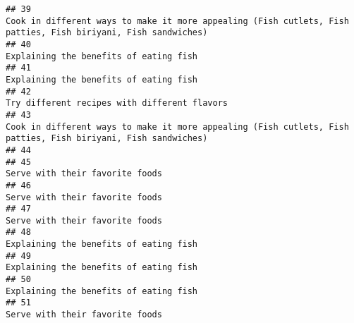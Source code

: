 \documentclass[
]{article}
\begin{document}
\begin{verbatim}
## 39                                                                                                 Cook in different ways to make it more appealing (Fish cutlets, Fish patties, Fish biriyani, Fish sandwiches)
## 40                                                                                                                                                                        Explaining the benefits of eating fish
## 41                                                                                                                                                                        Explaining the benefits of eating fish
## 42                                                                                                                                                                  Try different recipes with different flavors
## 43                                                                                                 Cook in different ways to make it more appealing (Fish cutlets, Fish patties, Fish biriyani, Fish sandwiches)
## 44                                                                                                                                                                                                              
## 45                                                                                                                                                                               Serve with their favorite foods
## 46                                                                                                                                                                               Serve with their favorite foods
## 47                                                                                                                                                                               Serve with their favorite foods
## 48                                                                                                                                                                        Explaining the benefits of eating fish
## 49                                                                                                                                                                        Explaining the benefits of eating fish
## 50                                                                                                                                                                        Explaining the benefits of eating fish
## 51                                                                                                                                                                               Serve with their favorite foods

\end{verbatim}
\end{document}
